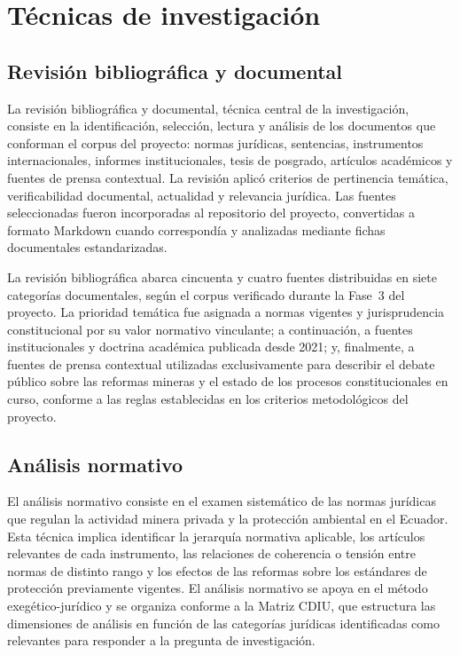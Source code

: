\section{Técnicas de investigación}

\subsection{Revisión bibliográfica y documental}

La revisión bibliográfica y documental, técnica central de la investigación, consiste en la identificación, selección, lectura y análisis de los documentos que conforman el corpus del proyecto: normas jurídicas, sentencias, instrumentos internacionales, informes institucionales, tesis de posgrado, artículos académicos y fuentes de prensa contextual. La revisión aplicó criterios de pertinencia temática, verificabilidad documental, actualidad y relevancia jurídica. Las fuentes seleccionadas fueron incorporadas al repositorio del proyecto, convertidas a formato Markdown cuando correspondía y analizadas mediante fichas documentales estandarizadas.

La revisión bibliográfica abarca cincuenta y cuatro fuentes distribuidas en siete categorías documentales, según el corpus verificado durante la Fase~3 del proyecto. La prioridad temática fue asignada a normas vigentes y jurisprudencia constitucional por su valor normativo vinculante; a continuación, a fuentes institucionales y doctrina académica publicada desde 2021; y, finalmente, a fuentes de prensa contextual utilizadas exclusivamente para describir el debate público sobre las reformas mineras y el estado de los procesos constitucionales en curso, conforme a las reglas establecidas en los criterios metodológicos del proyecto.

\subsection{Análisis normativo}

El análisis normativo consiste en el examen sistemático de las normas jurídicas que regulan la actividad minera privada y la protección ambiental en el Ecuador. Esta técnica implica identificar la jerarquía normativa aplicable, los artículos relevantes de cada instrumento, las relaciones de coherencia o tensión entre normas de distinto rango y los efectos de las reformas sobre los estándares de protección previamente vigentes. El análisis normativo se apoya en el método exegético-jurídico y se organiza conforme a la Matriz CDIU, que estructura las dimensiones de análisis en función de las categorías jurídicas identificadas como relevantes para responder a la pregunta de investigación.

